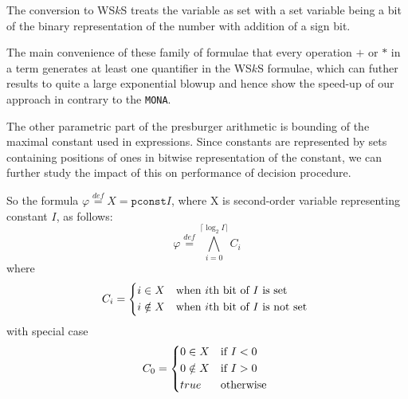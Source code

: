 The conversion to WS$k$S treats the variable as set with a set variable being a
bit of the binary representation of the number with addition of a sign bit.

The main convenience of these family of formulae that every operation $+$ or $*$
in a term generates at least one quantifier in the WS$k$S formulae, which can
futher results to quite a large exponential blowup and hence show the speed-up
of our approach in contrary to the \texttt{MONA}.

The other parametric part of the presburger arithmetic is bounding of the
maximal constant used in expressions. Since constants are represented by sets
containing positions of ones in bitwise representation of the constant, we can
further study the impact of this on performance of decision procedure.

So the formula $\varphi \overset{\mathit{def}}{=} X = \mathtt{pconst}{I}$, where
X is second-order variable representing constant $I$, as follows:
\begin{equation}
 \varphi \overset{\mathit{def}}{=} \bigwedge_{i = 0}^{\lceil \log_2 I\rceil} C_i
\end{equation}
where
\begin{equation}
  C_i = \begin{dcases*}
         i \in X  & when $i$th bit of $I$ is set\\
         i \notin X & when $i$th bit of $I$ is not set
         \end{dcases*}
\end{equation}
with special case
\begin{equation}
  C_0 = \begin{dcases*}
          0 \in X  & if $I < 0$\\
         0 \notin X & if $I > 0$\\
         true & otherwise
         \end{dcases*}
\end{equation}

